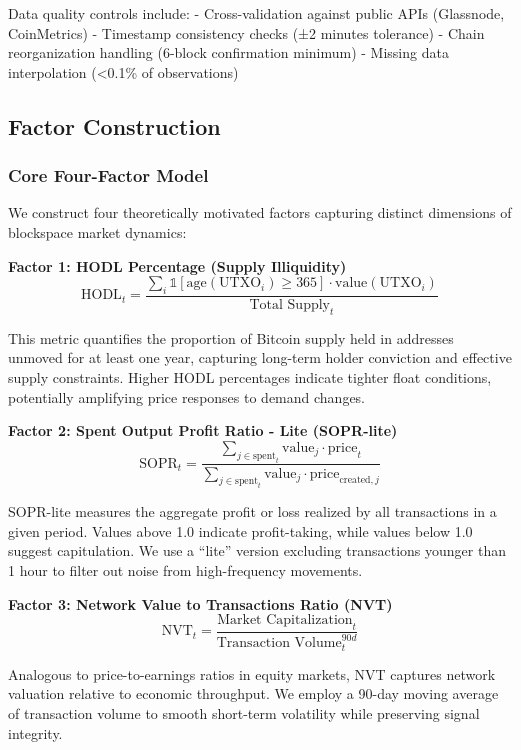 \documentclass[
  12pt,
  letterpaper,
  DIV=11,
  numbers=noendperiod]{scrartcl}
\begin{document}
Data quality controls include: - Cross-validation against public APIs
(Glassnode, CoinMetrics) - Timestamp consistency checks (±2 minutes
tolerance) - Chain reorganization handling (6-block confirmation
minimum) - Missing data interpolation (\textless0.1\% of observations)

\subsection{Factor Construction}\label{factor-construction}

\subsubsection{Core Four-Factor Model}\label{core-four-factor-model}

We construct four theoretically motivated factors capturing distinct
dimensions of blockspace market dynamics:

\textbf{Factor 1: HODL Percentage (Supply Illiquidity)}
\[\text{HODL}_{t} = \frac{\sum_{i} \mathbb{1}[\text{age}(\text{UTXO}_i) \geq 365] \cdot \text{value}(\text{UTXO}_i)}{\text{Total Supply}_t}\]

This metric quantifies the proportion of Bitcoin supply held in
addresses unmoved for at least one year, capturing long-term holder
conviction and effective supply constraints. Higher HODL percentages
indicate tighter float conditions, potentially amplifying price
responses to demand changes.

\textbf{Factor 2: Spent Output Profit Ratio - Lite (SOPR-lite)}
\[\text{SOPR}_{t} = \frac{\sum_{j \in \text{spent}_t} \text{value}_j \cdot \text{price}_t}{\sum_{j \in \text{spent}_t} \text{value}_j \cdot \text{price}_{\text{created},j}}\]

SOPR-lite measures the aggregate profit or loss realized by all
transactions in a given period. Values above 1.0 indicate profit-taking,
while values below 1.0 suggest capitulation. We use a ``lite'' version
excluding transactions younger than 1 hour to filter out noise from
high-frequency movements.

\textbf{Factor 3: Network Value to Transactions Ratio (NVT)}
\[\text{NVT}_{t} = \frac{\text{Market Capitalization}_t}{\text{Transaction Volume}_t^{90d}}\]

Analogous to price-to-earnings ratios in equity markets, NVT captures
network valuation relative to economic throughput. We employ a 90-day
moving average of transaction volume to smooth short-term volatility
while preserving signal integrity.
\end{document}

